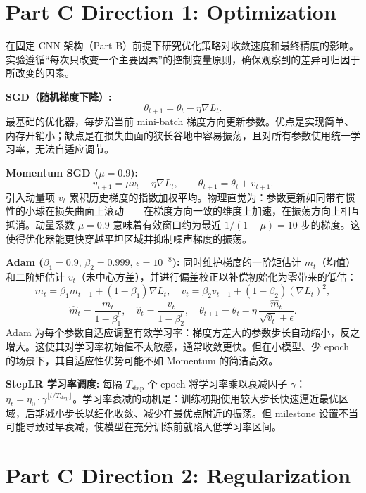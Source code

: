 \documentclass[11pt,fontset=fandol]{ctexart}
\begin{document}
\section{Part C Direction 1: Optimization}

在固定 CNN 架构（Part B）前提下研究优化策略对收敛速度和最终精度的影响。实验遵循``每次只改变一个主要因素''的控制变量原则，确保观察到的差异可归因于所改变的因素。

\smallskip\noindent\textbf{SGD（随机梯度下降）:}\;
\[
    \theta_{t+1} = \theta_t - \eta \nabla L_t.
\]
最基础的优化器，每步沿当前 mini-batch 梯度方向更新参数。优点是实现简单、内存开销小；缺点是在损失曲面的狭长谷地中容易振荡，且对所有参数使用统一学习率，无法自适应调节。

\smallskip\noindent\textbf{Momentum SGD ($\mu\!=\!0.9$):}\;
\[
    v_{t+1} = \mu v_t - \eta \nabla L_t,\qquad \theta_{t+1} = \theta_t + v_{t+1}.
\]
引入动量项 $v_t$ 累积历史梯度的指数加权平均。物理直觉为：参数更新如同带有惯性的小球在损失曲面上滚动——在梯度方向一致的维度上加速，在振荡方向上相互抵消。动量系数 $\mu = 0.9$ 意味着有效窗口约为最近 $1/(1-\mu) = 10$ 步的梯度。这使得优化器能更快穿越平坦区域并抑制噪声梯度的振荡。

\smallskip\noindent\textbf{Adam ($\beta_1\!=\!0.9,\,\beta_2\!=\!0.999,\,\epsilon\!=\!10^{-8}$):}\;
同时维护梯度的一阶矩估计 $m_t$（均值）和二阶矩估计 $v_t$（未中心方差），并进行偏差校正以补偿初始化为零带来的低估：
\[
    m_t = \beta_1 m_{t-1} + (1{-}\beta_1)\nabla L_t,\quad
    v_t = \beta_2 v_{t-1} + (1{-}\beta_2)(\nabla L_t)^2,
\]
\[
    \hat{m}_t = \frac{m_t}{1-\beta_1^t},\quad
    \hat{v}_t = \frac{v_t}{1-\beta_2^t},\quad
    \theta_{t+1} = \theta_t - \eta\,\frac{\hat{m}_t}{\sqrt{\hat{v}_t} + \epsilon}.
\]
Adam 为每个参数自适应调整有效学习率：梯度方差大的参数步长自动缩小，反之增大。这使其对学习率初始值不太敏感，通常收敛更快。但在小模型、少 epoch 的场景下，其自适应性优势可能不如 Momentum 的简洁高效。

\smallskip\noindent\textbf{StepLR 学习率调度:}\;
每隔 $T_\text{step}$ 个 epoch 将学习率乘以衰减因子 $\gamma$：$\eta_t = \eta_0 \cdot \gamma^{\lfloor t / T_\text{step} \rfloor}$。学习率衰减的动机是：训练初期使用较大步长快速逼近最优区域，后期减小步长以细化收敛、减少在最优点附近的振荡。但 milestone 设置不当可能导致过早衰减，使模型在充分训练前就陷入低学习率区间。

\section{Part C Direction 2: Regularization}
\end{document}
